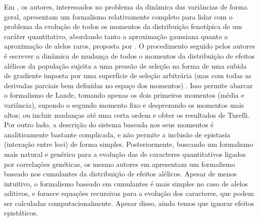 Em \cite{Barton1987}, os autores, interessados no problema da dinâmica
das variâncias de forma geral, apresentam um formalismo relativamente
completo para lidar com o problema da evolução de todos os momentos da
distribuição fenotípica de um caráter quantitativo, abordando tanto a
aproximação gaussiana quanto a aproximação de alelos raros, proposta por
\cite{Turelli1984}.
O procedimento seguido pelos autores é escrever a dinâmica de mudança de
todos o momentos da distribuição de efeitos alélicos da população
sujeita a uma pressão de seleção na forma de uma subida de gradiente
imposta por uma superfície de seleção arbitrária (mas com todas as
derivadas parciais bem definidas no espaço dos momentos)
\citep{Arnold2001a}.
Isso permite abarcar o formalismo de Lande, tomando apenas os dois
primeiros momentos (média e variância), supondo o segundo momento fixo e
desprezando os momentos mais altos; ou incluir mudanças até uma certa
ordem e obter os resultados de Turelli.
Por outro lado, a descrição do sistema baseada nos seus momentos é
analiticamente bastante complicada, e não permite a inclusão de
epistasia (interação entre loci) de forma simples.
Posteriormente, buscando um formalismo mais natural e genérico para a
evolução das de caracteres quantitativos ligados por correlações
genéticas, os mesmo autores em \cite{Turelli1994} apresentam um
formalismo baseado nos cumulantes da distribuição de efeitos alélicos.
Apesar de menos intuitivo, o formalismo baseado em cumulantes é mais
simples no caso de alelos aditivos, e fornece equações
recursivas para a evolução dos caracteres, que podem ser calculadas
computacionalmente.
Apesar disso, ainda temos que ignorar efeitos epistáticos.

